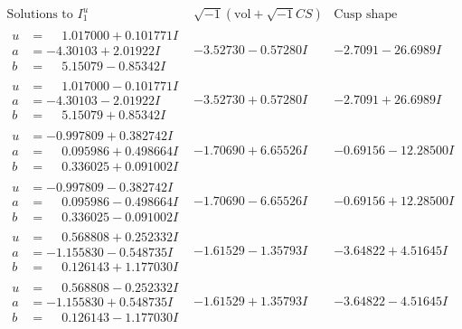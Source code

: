 \documentclass[1p]{elsarticle_modified}
\theoremstyle{definition}
\newcommand{\I}{\sqrt{-1}}
\begin{document}
$$\begin{array}{c|c|c}  
\text{Solutions to }I^u_{1}& \I (\text{vol} + \sqrt{-1}CS) & \text{Cusp shape}\\
 \hline 
\begin{aligned}
u &= \phantom{-}1.017000 + 0.101771 I \\
a &= -4.30103 + 2.01922 I \\
b &= \phantom{-}5.15079 - 0.85342 I\end{aligned}
 & -3.52730 - 0.57280 I & -2.7091 - 26.6989 I \\ \hline\begin{aligned}
u &= \phantom{-}1.017000 - 0.101771 I \\
a &= -4.30103 - 2.01922 I \\
b &= \phantom{-}5.15079 + 0.85342 I\end{aligned}
 & -3.52730 + 0.57280 I & -2.7091 + 26.6989 I \\ \hline\begin{aligned}
u &= -0.997809 + 0.382742 I \\
a &= \phantom{-}0.095986 + 0.498664 I \\
b &= \phantom{-}0.336025 + 0.091002 I\end{aligned}
 & -1.70690 + 6.65526 I & -0.69156 - 12.28500 I \\ \hline\begin{aligned}
u &= -0.997809 - 0.382742 I \\
a &= \phantom{-}0.095986 - 0.498664 I \\
b &= \phantom{-}0.336025 - 0.091002 I\end{aligned}
 & -1.70690 - 6.65526 I & -0.69156 + 12.28500 I \\ \hline\begin{aligned}
u &= \phantom{-}0.568808 + 0.252332 I \\
a &= -1.155830 - 0.548735 I \\
b &= \phantom{-}0.126143 + 1.177030 I\end{aligned}
 & -1.61529 - 1.35793 I & -3.64822 + 4.51645 I \\ \hline\begin{aligned}
u &= \phantom{-}0.568808 - 0.252332 I \\
a &= -1.155830 + 0.548735 I \\
b &= \phantom{-}0.126143 - 1.177030 I\end{aligned}
 & -1.61529 + 1.35793 I & -3.64822 - 4.51645 I \\ \hline\begin{aligned}

\end{aligned}
\end{array}$$
\end{document}
